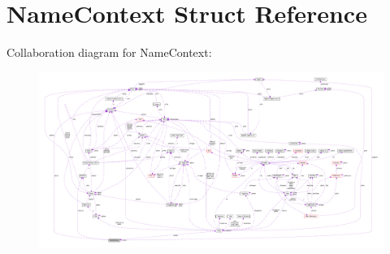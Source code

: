\hypertarget{structNameContext}{}\section{Name\+Context Struct Reference}
\label{structNameContext}


Collaboration diagram for Name\+Context\+:\nopagebreak
\begin{figure}[H]
\begin{center}
\leavevmode
\includegraphics[width=350pt]{structNameContext__coll__graph}
\end{center}
\end{figure}
